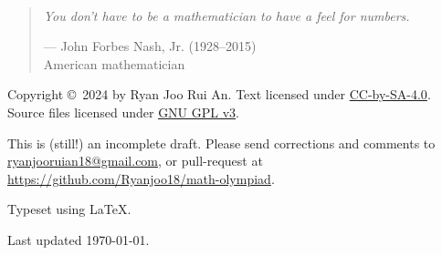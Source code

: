 \

\vfill

\begin{quote}
\textit{You don't have to be a mathematician to have a feel for numbers.}

\begin{flushright}--- John Forbes Nash, Jr. (1928--2015)\\
American mathematician
\end{flushright}
\end{quote}

\vfill

Copyright \copyright \ 2024 by Ryan Joo Rui An. 
Text licensed under \href{https://creativecommons.org/licenses/by-sa/4.0/}{CC-by-SA-4.0}. Source files licensed under \href{https://choosealicense.com/licenses/gpl-3.0/}{GNU GPL v3}.

This is (still!) an incomplete draft. Please send corrections and comments to \url{ryanjooruian18@gmail.com}, or pull-request at \url{https://github.com/Ryanjoo18/math-olympiad}.

Typeset using \LaTeX.

Last updated \today.
\thispagestyle{empty}